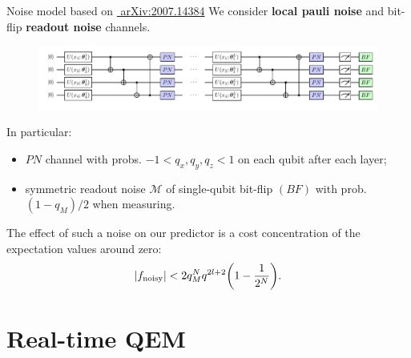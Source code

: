 \documentclass[8pt, xcolor={svgnames}, hyperref={linkcolor=black}, aspectratio=169]{beamer}
\begin{document}
\begin{frame}{Noise model based on \hfill \href{https://arxiv.org/abs/2007.14384}{\faBook\,\,arXiv:2007.14384}}
\pause
We consider \textbf{local pauli noise} and bit-flip \textbf{readout noise} channels.
\pause
\begin{figure}
\includegraphics[width=1\textwidth]{figures/noisy.pdf}
\end{figure}
\pause
In particular:
\pause
\begin{itemize}[noitemsep]
\item[\faVolumeUp] $PN$ channel with probs. $-1 < q_x, q_y, q_z < 1$
on each qubit after each layer;
\pause
\item[\faRandom] symmetric readout noise $\mathcal{M}$ of single-qubit bit-flip $(BF)$ 
with prob. $(1-q_M)/2$ when measuring.
\end{itemize}
\pause
\begin{tcolorbox}[colback=red!15, title=Noise effect]
\pause
The effect of such a noise on our predictor is a cost concentration of the expectation
values around zero:
\pause
$$ |f_{\rm noisy}| < 2 q_M^N q^{2l + 2} \biggl(1-\frac{1}{2^N}\biggr). $$
\end{tcolorbox}
\end{frame}

\section{Real-time QEM}
\end{document}
